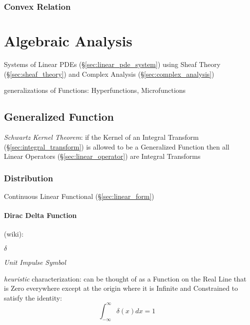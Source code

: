 \subsubsection{Convex Relation}\label{sec:convex_relation}



\section{Algebraic Analysis}\label{sec:algebraic_analysis}

Systems of Linear PDEs (\S\ref{sec:linear_pde_system}) using Sheaf Theory
(\S\ref{sec:sheaf_theory}) and Complex Analysis (\S\ref{sec:complex_analysis})

generalizations of Functions: Hyperfunctions, Microfunctions



\subsection{Generalized Function}\label{sec:generalized_function}

\emph{Schwartz Kernel Theorem}: if the Kernel of an Integral Transform
(\S\ref{sec:integral_transform}) is allowed to be a Generalized Function then
all Linear Operators (\S\ref{sec:linear_operator}) are Integral Transforms



\subsubsection{Distribution}\label{sec:distribution}

Continuous Linear Functional (\S\ref{sec:linear_form})



\paragraph{Dirac Delta Function}\label{sec:dirac_delta}\hfill

(wiki):

$\delta$

\emph{Unit Impulse Symbol}

\emph{heuristic} characterization: can be thought of as a Function on the Real
Line that is Zero everywhere except at the origin where it is Infinite and
Constrained to satisfy the identity:
\[
  \int_{-\infty}^\infty \delta(x) dx = 1
\]

